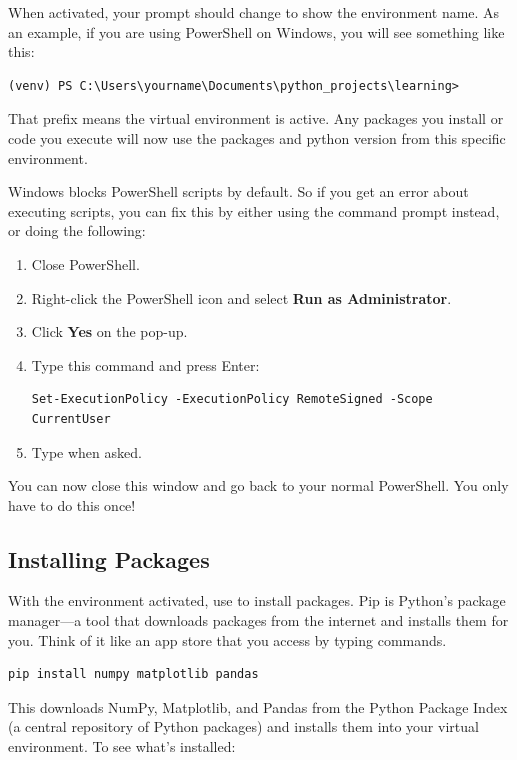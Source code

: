 When activated, your prompt should change to show the environment name. As an example, if you are using PowerShell on Windows, you will see something like this:

\begin{lstlisting}[style=shellstyle]
(venv) PS C:\Users\yourname\Documents\python_projects\learning>
\end{lstlisting}

That  prefix means the virtual environment is active. Any packages you install or code you execute will now use the packages and python version from this specific environment.

\begin{osbox}
Windows blocks PowerShell scripts by default. So if you get an error about executing scripts, you can fix this by either using the command prompt instead, or doing the following:
\begin{enumerate}
    \item Close PowerShell.
    \item Right-click the PowerShell icon and select \textbf{Run as Administrator}. 
    \item Click \textbf{Yes} on the pop-up.
    \item Type this command and press Enter:
\begin{lstlisting}[style=shellstyle]
Set-ExecutionPolicy -ExecutionPolicy RemoteSigned -Scope CurrentUser
\end{lstlisting}
    \item Type  when asked.
\end{enumerate}
You can now close this window and go back to your normal PowerShell. You only have to do this once!
\end{osbox}

\subsection{Installing Packages}

With the environment activated, use  to install packages. Pip is Python's package manager---a tool that downloads packages from the internet and installs them for you. Think of it like an app store that you access by typing commands.

\begin{lstlisting}[style=shellstyle]
pip install numpy matplotlib pandas
\end{lstlisting}

This downloads NumPy, Matplotlib, and Pandas from the Python Package Index (a central repository of Python packages) and installs them into your virtual environment. To see what's installed:

